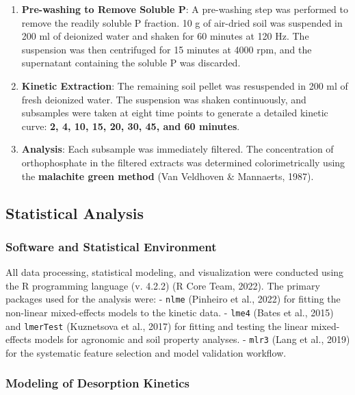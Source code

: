 \documentclass[
  a4paper,
]{article}
\begin{document}
\begin{enumerate}
\def\labelenumi{\arabic{enumi}.}
\item
  \textbf{Pre-washing to Remove Soluble P}: A pre-washing step was
  performed to remove the readily soluble P fraction. 10 g of air-dried
  soil was suspended in 200 ml of deionized water and shaken for 60
  minutes at 120 Hz. The suspension was then centrifuged for 15 minutes
  at 4000 rpm, and the supernatant containing the soluble P was
  discarded.
\item
  \textbf{Kinetic Extraction}: The remaining soil pellet was resuspended
  in 200 ml of fresh deionized water. The suspension was shaken
  continuously, and subsamples were taken at eight time points to
  generate a detailed kinetic curve: \textbf{2, 4, 10, 15, 20, 30, 45,
  and 60 minutes}.
\item
  \textbf{Analysis}: Each subsample was immediately filtered. The
  concentration of orthophosphate in the filtered extracts was
  determined colorimetrically using the \textbf{malachite green method}
  (Van Veldhoven \& Mannaerts, 1987).
\end{enumerate}

\subsection{Statistical Analysis}\label{sec-statistical-analysis}

\subsubsection{Software and Statistical
Environment}\label{software-and-statistical-environment}

All data processing, statistical modeling, and visualization were
conducted using the R programming language (v. 4.2.2) (R Core Team,
2022). The primary packages used for the analysis were: - \texttt{nlme}
(Pinheiro et al., 2022) for fitting the non-linear mixed-effects models
to the kinetic data. - \texttt{lme4} (Bates et al., 2015) and
\texttt{lmerTest} (Kuznetsova et al., 2017) for fitting and testing the
linear mixed-effects models for agronomic and soil property analyses. -
\texttt{mlr3} (Lang et al., 2019) for the systematic feature selection
and model validation workflow.

\subsubsection{Modeling of Desorption
Kinetics}\label{sec-modeling-of-desorption-kinetics}
\end{document}
